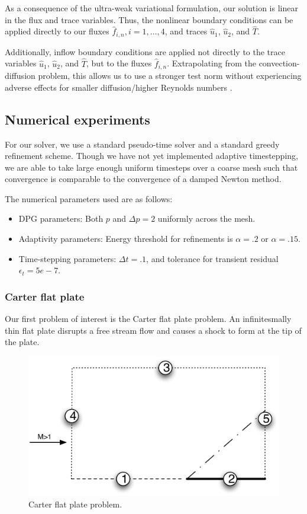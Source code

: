 As a consequence of the ultra-weak variational formulation, our solution is linear in the flux and trace variables. Thus, the nonlinear boundary conditions can be applied directly to our fluxes $\widehat{f}_{i,n}, i = 1,\ldots,4$, and traces $\widehat{u}_1$, $\widehat{u}_2$, and $\widehat{T}$. 

Additionally, inflow boundary conditions are applied not directly to the trace variables $\widehat{u}_1$, $\widehat{u}_2$, and $\widehat{T}$, but to the fluxes $\widehat{f}_{i,n}$. Extrapolating from the convection-diffusion problem, this allows us to use a stronger test norm without experiencing adverse effects for smaller diffusion/higher Reynolds numbers \cite{DPGrobustness,DPGrobustness2}.

\subsection{Numerical experiments}

For our solver, we use a standard pseudo-time solver and a standard greedy refinement scheme. Though we have not yet implemented adaptive timestepping, we are able to take large enough uniform timesteps over a coarse mesh such that convergence is comparable to the convergence of a damped Newton method. 

The numerical parameters used are as follows:
\begin{itemize}
\item{DPG parameters:} Both $p$ and $\Delta p = 2$ uniformly across the mesh. 
\item{Adaptivity parameters:} Energy threshold for refinements is $\alpha = .2$ or $\alpha = .15$. 
\item{Time-stepping parameters:} $\Delta t = .1$, and tolerance for transient residual $\epsilon_t = 5e-7$.
\end{itemize}

\subsubsection{Carter flat plate}

Our first problem of interest is the Carter flat plate problem. An infinitesmally thin flat plate disrupts a free stream flow and causes a shock to form at the tip of the plate. 

\begin{figure}[!h]
\centering
\includegraphics[scale=.5]{figs/flat_plate_BCs.pdf}
\caption{Carter flat plate problem.}
\end{figure}

